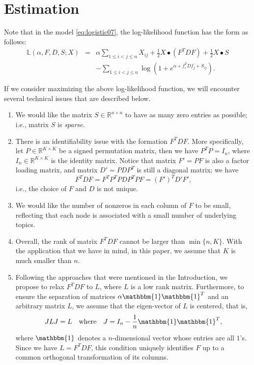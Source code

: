 \documentclass[AMS,STIX1COL]{WileyNJD-v2}
\begin{document}
{\section{Estimation}
\label{sec:estimate}
Note that in the model \eqref{eq:logistic07}, the log-likelihood function has the form as follows:
\begin{eqnarray}
\label{eq:logistic08}
\mathbb{L}(\alpha,  F, D, S; X)
&=& \alpha \sum_{1\le i< j\le n}X_{ij} +\frac{1}{2} X \bullet (F^T D F) +\frac{1}{2} X \bullet S \\
&& -\sum_{1\le i<j\le n} \log \left(1 + e^{\alpha + f_i^T D f_j +S_{ij} }\right). \nonumber
\end{eqnarray}

If we consider maximizing the above log-likelihood function,
we will encounter several technical issues that are described below.
\begin{enumerate}
\item We would like the matrix $S \in \mathbb{R}^{n \times n}$ to have as many zero entries as possible; i.e., matrix $S$ is {\it sparse.}

\item There is an identifiability issue with the formation $F^T D F$.
More specifically, let $P \in \mathbb{R}^{K \times K}$ be a signed permutation matrix, then we have $P^T P = I_n$, where $I_n \in \mathbb{R}^{K \times K}$ is the identity matrix.
Notice that matrix $F' = PF$ is also a factor loading matrix, and
matrix $D' = P D P^T$ is still a diagonal matrix;
we have
$$
F^T D F = F^T P^T P D P^T P F = (F')^T D' F',
$$
i.e., the choice of $F$ and $D$ is not unique.

\item We would like the number of nonzeros in each column of $F$ to be small, reflecting that each node is associated with a small number of underlying topics.

\item Overall, the rank of matrix $F^T D F$ cannot be larger than $\min\{n,K\}$.
With the application that we have in mind, in this paper, we assume that $K$ is much smaller than $n$.

\item Following the approaches that were mentioned in the Introduction, we propose to relax $F^T D F$ to $L$, where $L$ is a low rank matrix.
Furthermore, to ensure the separation of matrices $\alpha\mathbbm{1}\mathbbm{1}^T$ and an arbitrary matrix $L$, we assume that the eigen-vector of $L$ is centered, that is,
\[
    JLJ = L \quad \mbox{where} \quad
    J=I_{n}-\frac{1}{n}\mathbbm{1}\mathbbm{1}^T,
\]
where $\mathbbm{1}$ denotes a $n$-dimensional vector whose entries are all $1$'s. Since we have $L=F^TDF$, this condition uniquely identifies $F$ up to a common orthogonal transformation of its columns.


\end{enumerate}}
\end{document}
